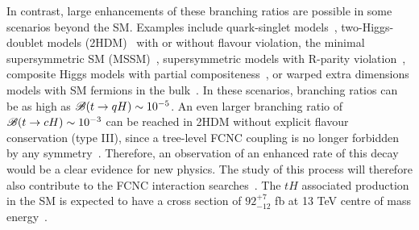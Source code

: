In contrast, large enhancements of these branching ratios are possible in some scenarios beyond the SM.
Examples include quark-singlet models~\cite{AguilarSaavedra:2002kr}, two-Higgs-doublet models (2HDM)~\cite{Branco:2hdm2012} with or without flavour violation,
the minimal supersymmetric SM (MSSM)~\cite{Bejar:2000ub, Guasch:1999jp,Cao:2007dk,Cao:2014udj},
supersymmetric models with R-parity violation~\cite{Eilam:2001dh}, composite Higgs models with partial compositeness~\cite{Azatov:2014lha}, 
or warped extra dimensions models with SM fermions in the bulk~\cite{Azatov:2009na}. 
In these scenarios, branching ratios can be as high as $\mathscr{B}(t\to qH) \sim 10^{-5}$. 
An even larger branching ratio of  $\mathscr{B}(t\to cH) \sim 10^{-3}$ can be reached in 2HDM without explicit flavour conservation (type III),
since a tree-level FCNC coupling is no longer forbidden by any symmetry~\cite{Cheng:1987rs,Baum:2008qm,Chen:2013qta,Chiang:2015cba,Crivellin:2015hha,Botella:2015hoa, Gori:2017tvg,Chiang:2017fjr}. 
Therefore, an observation of an enhanced rate of this decay would be a clear evidence for new physics.
The study of this process will therefore also contribute to the FCNC interaction searches~\cite{Greljo:2014dka}.
The $tH$ associated production in the SM is expected to have a cross section of $92^{+7}_{-12}$ fb at 13 TeV centre of mass energy~\cite{deFlorian:2016spz}.

